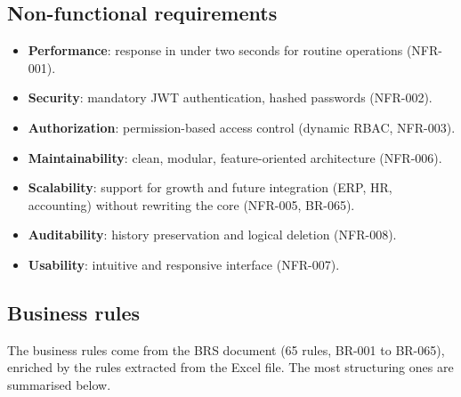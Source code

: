 \subsection{Non-functional requirements}
\begin{itemize}
    \item \textbf{Performance}: response in under two seconds for routine operations (NFR-001).
    \item \textbf{Security}: mandatory JWT authentication, hashed passwords (NFR-002).
    \item \textbf{Authorization}: permission-based access control (dynamic RBAC, NFR-003).
    \item \textbf{Maintainability}: clean, modular, feature-oriented architecture (NFR-006).
    \item \textbf{Scalability}: support for growth and future integration (ERP, HR, accounting)
    without rewriting the core (NFR-005, BR-065).
    \item \textbf{Auditability}: history preservation and logical deletion (NFR-008).
    \item \textbf{Usability}: intuitive and responsive interface (NFR-007).
\end{itemize}

\subsection{Business rules}
The business rules come from the BRS document (65 rules, BR-001 to BR-065), enriched by the rules
extracted from the Excel file. The most structuring ones are summarised below.

